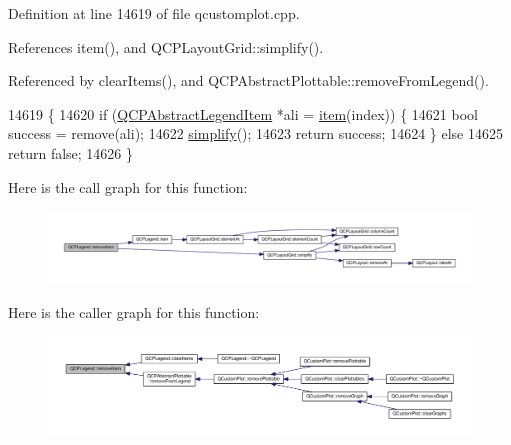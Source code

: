 Definition at line 14619 of file qcustomplot.\+cpp.



References item(), and Q\+C\+P\+Layout\+Grid\+::simplify().



Referenced by clear\+Items(), and Q\+C\+P\+Abstract\+Plottable\+::remove\+From\+Legend().


\begin{DoxyCode}
14619                                     \{
14620   \textcolor{keywordflow}{if} (\hyperlink{class_q_c_p_abstract_legend_item}{QCPAbstractLegendItem} *ali = \hyperlink{class_q_c_p_legend_a454272d7094437beb3278a2294006da5}{item}(index)) \{
14621     \textcolor{keywordtype}{bool} success = \textcolor{keyword}{remove}(ali);
14622     \hyperlink{class_q_c_p_layout_grid_a08bba60e4acd20165526a8fd7f986b58}{simplify}();
14623     \textcolor{keywordflow}{return} success;
14624   \} \textcolor{keywordflow}{else}
14625     \textcolor{keywordflow}{return} \textcolor{keyword}{false};
14626 \}
\end{DoxyCode}


Here is the call graph for this function\+:\nopagebreak
\begin{figure}[H]
\begin{center}
\leavevmode
\includegraphics[width=350pt]{class_q_c_p_legend_ac91595c3eaa746fe6321d2eb952c63bb_cgraph}
\end{center}
\end{figure}




Here is the caller graph for this function\+:\nopagebreak
\begin{figure}[H]
\begin{center}
\leavevmode
\includegraphics[width=350pt]{class_q_c_p_legend_ac91595c3eaa746fe6321d2eb952c63bb_icgraph}
\end{center}
\end{figure}


